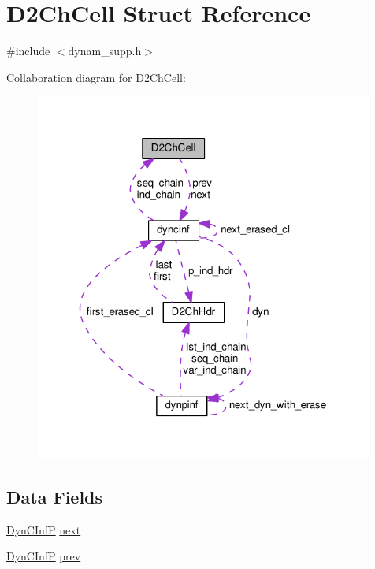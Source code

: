 \hypertarget{structD2ChCell}{}\section{D2\+Ch\+Cell Struct Reference}
\label{structD2ChCell}


{\ttfamily \#include $<$dynam\+\_\+supp.\+h$>$}



Collaboration diagram for D2\+Ch\+Cell\+:\nopagebreak
\begin{figure}[H]
\begin{center}
\leavevmode
\includegraphics[width=315pt]{structD2ChCell__coll__graph}
\end{center}
\end{figure}
\subsection*{Data Fields}
\begin{DoxyCompactItemize}
\item 
\hyperlink{dynam__supp_8h_ae9665ae9a3ee194834c9995b875aed48}{Dyn\+C\+InfP} \hyperlink{structD2ChCell_ab3eac88c8e41656c4dfa195b314fef5c}{next}
\item 
\hyperlink{dynam__supp_8h_ae9665ae9a3ee194834c9995b875aed48}{Dyn\+C\+InfP} \hyperlink{structD2ChCell_a93c613b80554c6b885b8c680658475cf}{prev}
\end{DoxyCompactItemize}


